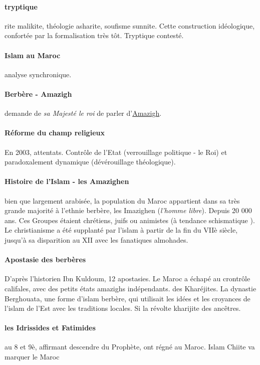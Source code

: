 \paragraph{tryptique} rite malikite, théologie asharite, soufisme sunnite. Cette construction idéologique, confortée par la formalisation très tôt.
Tryptique contesté.

\paragraph{Islam au Maroc} analyse synchronique.

\paragraph{Berbère - Amazigh} demande de \textit{sa Majesté le roi} de parler d'\href{https://fr.wikipedia.org/wiki/Berb%C3%A8res}{Amazigh}. 

\paragraph{Réforme du champ religieux}
En 2003, attentats.  Contrôle de l'Etat (verrouillage politique - le Roi) et paradoxalement dynamique (dévérouillage théologique). 

\paragraph{Histoire de l'Islam - les Amazighen}  bien que largement arabisée, la population du Maroc appartient dans sa très grande majorité à l'ethnie berbère, les Imazighen (\textit{l'homme libre}). Depuis 20 000 ans.  Ces Groupes étaient chrétiens, juifs ou animistes (à tendance schismatique ). Le christianisme a été supplanté par l'islam à partir de la fin du VIIè siècle, jusqu'à sa disparition au XII avec les fanatiques almohades.

\paragraph{Apostasie des berbères} D'après l'historien Ibn Kuldoum, 12 apostasies. Le Maroc a échapé au crontrôle califales, avec des petits états amazighs indépendants. des Kharéjites. La dynastie Berghouata, une forme d'islam berbère, qui utilisait les idées et les croyances de l'islam de l'Est avec les traditions locales.  Si la révolte kharijite des ancêtres.

\paragraph{les Idrissides et Fatimides} au 8 et 9è, affirmant descendre du Prophète, ont régné au Maroc.
Islam Chiite va marquer le Maroc 

